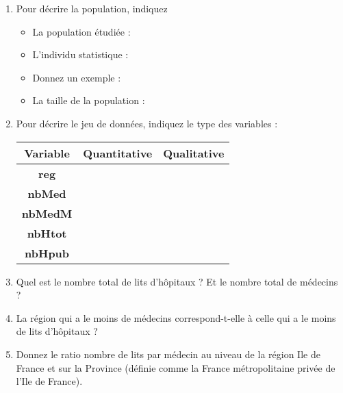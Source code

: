 \documentclass[a4paper,11pt]{article}
\begin{document}
\begin{enumerate}
\item Pour décrire la population, indiquez

\begin{itemize}
\item La population étudiée :


\item L'individu statistique :


\item[] Donnez un exemple :


\item La taille de la population :
\end{itemize}
\bigskip

\item Pour décrire le jeu de données, indiquez le type des variables :
\begin{center}
\begin{tabular}{|c|c|c|}
\hline 
Variable & Quantitative & Qualitative \\ 
\hline 
\textbf{reg} &  &  	 \\ 
\hline 
\textbf{nbMed} &  &  \\ 
\hline 
\textbf{nbMedM} &  &  \\ 
\hline
\textbf{nbHtot} &  &  \\ 
\hline 
\textbf{nbHpub} &  &  \\ 
\hline 
\end{tabular} 
\end{center}

 \bigskip
 
\item Quel est le nombre total de lits d'hôpitaux ? Et le nombre total de médecins ?


\item La région qui a le moins de médecins correspond-t-elle à celle qui a le moins de lits d'hôpitaux ?



\item Donnez le ratio nombre de lits par médecin au  niveau de la région Ile de France et sur la Province (définie comme la France métropolitaine privée de l'Ile de France).

\end{enumerate}
\end{document}
